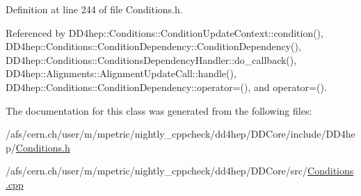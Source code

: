 Definition at line 244 of file Conditions.\+h.



Referenced by D\+D4hep\+::\+Conditions\+::\+Condition\+Update\+Context\+::condition(), D\+D4hep\+::\+Conditions\+::\+Condition\+Dependency\+::\+Condition\+Dependency(), D\+D4hep\+::\+Conditions\+::\+Conditions\+Dependency\+Handler\+::do\+\_\+callback(), D\+D4hep\+::\+Alignments\+::\+Alignment\+Update\+Call\+::handle(), D\+D4hep\+::\+Conditions\+::\+Condition\+Dependency\+::operator=(), and operator=().



The documentation for this class was generated from the following files\+:\begin{DoxyCompactItemize}
\item 
/afs/cern.\+ch/user/m/mpetric/nightly\+\_\+cppcheck/dd4hep/\+D\+D\+Core/include/\+D\+D4hep/\hyperlink{_conditions_8h}{Conditions.\+h}\item 
/afs/cern.\+ch/user/m/mpetric/nightly\+\_\+cppcheck/dd4hep/\+D\+D\+Core/src/\hyperlink{_conditions_8cpp}{Conditions.\+cpp}\end{DoxyCompactItemize}
